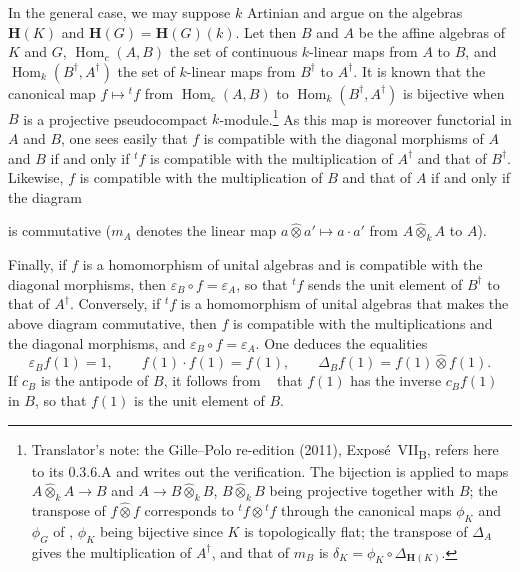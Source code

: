 In the general case, we may suppose \(k\) Artinian and argue on the
algebras \(\mathbf H(K)\) and \(\mathbf H(G)=\mathbf H(G)(k)\). Let then
\(B\) and \(A\) be the affine algebras of \(K\) and \(G\),
\(\operatorname{Hom}_c(A,B)\) the set of continuous \(k\)-linear maps
from \(A\) to \(B\), and \(\operatorname{Hom}_k(B^\dagger,A^\dagger)\)
the set of \(k\)-linear maps from \(B^\dagger\) to \(A^\dagger\). It is
known that the canonical map \(f\mapsto{}^tf\) from
\(\operatorname{Hom}_c(A,B)\) to
\(\operatorname{Hom}_k(B^\dagger,A^\dagger)\) is bijective when \(B\) is
a projective pseudocompact \(k\)-module.\footnote{Translator's note: the Gille--Polo re-edition (2011),
Exposé~VII\textsubscript{B}, refers here to its 0.3.6.A and writes out the
verification. The bijection is applied to maps \(A\widehat\otimes_kA\to B\) and
\(A\to B\widehat\otimes_kB\), \(B\widehat\otimes_kB\) being projective together
with \(B\); the transpose of \(f\widehat\otimes f\) corresponds to
\({}^tf\otimes{}^tf\) through the canonical maps \(\phi_K\) and \(\phi_G\) of
, \(\phi_K\) being bijective since \(K\) is topologically flat;
the transpose of \(\Delta_A\) gives the multiplication of \(A^\dagger\), and
that of \(m_B\) is \(\delta_K=\phi_K\circ\Delta_{\mathbf H(K)}\).} As this map is moreover
functorial in \(A\) and \(B\), one sees easily that \(f\) is compatible
with the diagonal morphisms of \(A\) and \(B\) if and only if \({}^tf\)
is compatible with the multiplication of \(A^\dagger\) and that of
\(B^\dagger\). Likewise, \(f\) is compatible with the multiplication of
\(B\) and that of \(A\) if and only if the diagram
\begin{center}
\end{center}
is commutative \textup{(\(m_A\) denotes the linear map
\(a\widehat\otimes a'\mapsto a\cdot a'\) from \(A\widehat\otimes_kA\) to
\(A\))}.

Finally, if \(f\) is a homomorphism of unital algebras and is compatible
with the diagonal morphisms, then \(\varepsilon_B\circ f=\varepsilon_A\),
so that \({}^tf\) sends the unit element of \(B^\dagger\) to that of
\(A^\dagger\). Conversely, if \({}^tf\) is a homomorphism of unital
algebras that makes the above diagram commutative, then \(f\) is
compatible with the multiplications and the diagonal morphisms, and
\(\varepsilon_B\circ f=\varepsilon_A\). One deduces the equalities
\[
  \varepsilon_Bf(1)=1,
  \qquad
  f(1)\cdot f(1)=f(1),
  \qquad
  \Delta_Bf(1)=f(1)\widehat\otimes f(1).
\]
If \(c_B\) is the antipode of \(B\), it follows from ~\textup{}
that \(f(1)\) has the inverse \(c_Bf(1)\) in \(B\), so that \(f(1)\) is
the unit element of \(B\).
